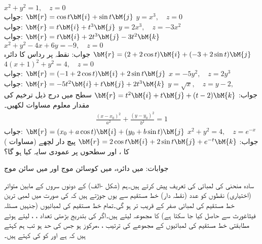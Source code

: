  \quad
$x^2+y^2=1,\quad z=0$\\
جواب:
$\bM{r}=\cos t\bM{i}+\sin t\bM{j}$
\quad
$y=x^3,\quad z=0$\\
جواب:
$\bM{r}=t\bM{i}+t^3\bM{j}$
\quad
$y=2x^3,\quad z=-3x^2$\\
جواب:
$\bM{r}=t\bM{i}+2t^3\bM{j}-3t^2\bM{k}$
\quad
$x^2+y^2-4x+6y=-9,\quad z=0$\\
جواب: نقطہ  پر رداس  کا دائرہ \quad
$\bM{r}=(2+2\cos t)\bM{i}+(-3+2\sin t)\bM{j}$
\quad
$4(x+1)^2+y^2=4,\quad z=0$\\
جواب:
$\bM{r}=(-1+2\cos t)\bM{i}+2\sin t\bM{j}$
\quad
$x=-5y^2,\quad z=2y^3$\\
جواب:
$\bM{r}=-5t^2\bM{i}+t\bM{j}+2t^3\bM{k}$
\quad
$y=\sqrt{x},\quad z=y-2,\quad $\\
جواب:
$\bM{r}=t^2\bM{i}+t\bM{j}+(t-2)\bM{k}$
 سطح میں درج ذیل ترخیم کی مقدار معلوم مساوات لکھیں۔
\begin{align*}
\frac{(x-x_0)^2}{a^2}+\frac{(y-y_0)^2}{b^2}=1
\end{align*}
جواب:
$\bM{r}=(x_0+a\cos t)\bM{i}+(y_0+b\sin t)\bM{j}$
\quad
$x^2+y^2=4,\quad z=e^{-x}$\\
جواب:
$\bM{r}=2\cos t\bM{i}+2\sin t\bM{j}+e^{-t}\bM{k}$
پیچ دار لچھے (مساوات ) کا ،  اور  سطحوں پر عمودی سایہ کیا ہو گا؟

جوابات: میں دائرہ،  میں کوسائن موج اور  میں سائن موج

سادہ منحنی  کی لمبائی کی تعریف پیش کرتے ہیں۔ہم  (شکل -الف) کے دونوں سروں کے مابین متواتر (اختیاری) نقطوں کو  عدد (نقطہ دار) خط مستقیم سے یوں جوڑتے ہیں کہ  کی صورت میں لمبی ترین خط مستقیم کی لمبائی صفر کے قریب تر ہو گی۔تمام خط مستقیم کی لمبائیوں (جنہیں مسئلہ فیثاغورث سے حاصل کیا جا سکتا ہے) کا مجموعہ لیتے ہیں۔اگر  کی بتدریج بڑھتی تعداد  ، ،  لیتے ہوئے مطابقتی خط مستقیم کی لمبائیوں کے مجموعے کی ترتیب  ، ، مرکوز ہو جس کی حد  ہو تب ہم کہتے ہیں کہ    ہے اور  کو  کی  کہتے ہیں۔ 

